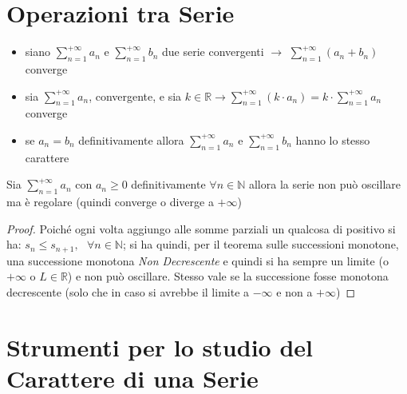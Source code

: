 \documentclass[a4paper,12pt, oneside]{book}
\begin{document}
\section{Operazioni tra Serie}
\begin{itemize}
  \item siano $\sum_{n=1}^{+\infty} a_n$ e $\sum_{n=1}^{+\infty} b_n$ due serie
  convergenti $\longrightarrow$ $\sum_{n=1}^{+\infty} (a_n+b_n)$ converge
  \item sia $\sum_{n=1}^{+\infty} a_n$, convergente, e sia $k\in \mathbb{R}
  \longrightarrow \sum_{n=1}^{+\infty} (k\cdot a_n)=k\cdot \sum_{n=1}^{+\infty}
  a_n$ converge
  \item se $a_n=b_n$ definitivamente allora $\sum_{n=1}^{+\infty} a_n$ e
  $\sum_{n=1}^{+\infty} b_n$ hanno lo stesso carattere
\end{itemize}

\begin{teorema} Sia $\sum_{n=1}^{+\infty} a_n$ con $a_n\geq 0$ definitivamente
  $\forall n\in \mathbb{N}$ allora la serie non può oscillare ma è regolare
  (quindi converge o diverge a $+\infty$)
\end{teorema}
\begin{proof} Poiché ogni volta aggiungo alle somme parziali un qualcosa di
  positivo si ha: $s_n\leq s_{n+1},\mbox{ } \forall n\in \mathbb{N}$; si ha
  quindi, per il teorema sulle successioni monotone, una successione monotona
  \textit{Non Decrescente} e quindi si ha sempre un limite (o $+\infty$ o $L\in
  \mathbb{R}$) e non può oscillare. Stesso vale se la successione fosse monotona
  decrescente (solo che in caso si avrebbe il limite a $-\infty$ e non a
  $+\infty$)
\end{proof}
\section{Strumenti per lo studio del Carattere di una Serie}
\end{document}
